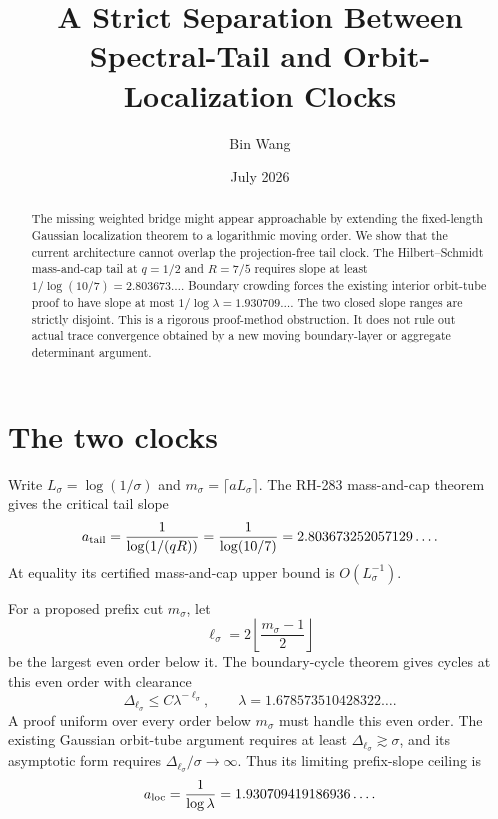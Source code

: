 \documentclass[11pt]{article}
\title{A Strict Separation Between Spectral-Tail and Orbit-Localization Clocks}
\author{Bin Wang}\date{July 2026}
\theoremstyle{remark}\newtheorem{remark}[theorem]{Remark}
\begin{document}
\maketitle
\begin{abstract}
The missing weighted bridge might appear approachable by extending the
fixed-length Gaussian localization theorem to a logarithmic moving order.
We show that the current architecture cannot overlap the projection-free
tail clock.  The Hilbert--Schmidt mass-and-cap tail at $q=1/2$ and $R=7/5$
requires slope at least $1/\log(10/7)=2.803673\ldots$.  Boundary crowding
forces the existing interior orbit-tube proof to have slope at most
$1/\log\lambda=1.930709\ldots$.  The two closed slope ranges are strictly
disjoint.  This is a rigorous proof-method obstruction.  It does not rule out
actual trace convergence obtained by a new moving boundary-layer or aggregate
determinant argument.
\end{abstract}

\section{The two clocks}
Write $L_\sigma=\log(1/\sigma)$ and
$m_\sigma=\lceil aL_\sigma\rceil$.  The RH-283 mass-and-cap theorem gives
the critical tail slope
\[
 a_{\rm tail}=\frac1{\log(1/(qR))}
 =\frac1{\log(10/7)}
 =2.803673252057129\ldots.
\]
At equality its certified mass-and-cap upper bound is
$O(L_\sigma^{-1})$.

For a proposed prefix cut $m_\sigma$, let
\[
 \ell_\sigma=2\left\lfloor\frac{m_\sigma-1}{2}\right\rfloor
\]
be the largest even order below it.  The boundary-cycle theorem gives cycles
at this even order with clearance
\[
 \Delta_{\ell_\sigma}\le C\lambda^{-\ell_\sigma},\qquad
 \lambda=1.678573510428322\ldots.
\]
A proof uniform over every order below $m_\sigma$ must handle this even
order.  The existing Gaussian orbit-tube argument requires at least
$\Delta_{\ell_\sigma}\gtrsim\sigma$, and its asymptotic form requires
$\Delta_{\ell_\sigma}/\sigma\to\infty$.  Thus its limiting prefix-slope
ceiling is
\[
 a_{\rm loc}=\frac1{\log\lambda}
 =1.930709419186936\ldots.
\]
\end{document}
